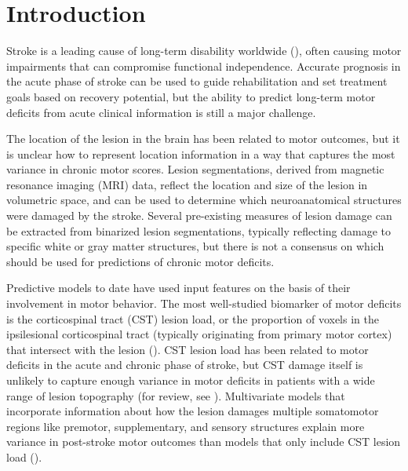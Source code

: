 \documentclass[10pt]{article}
\begin{document}
\section{Introduction}
Stroke is a leading cause of long-term disability worldwide (\cite{Katan2018-qn}), often causing motor impairments that can compromise functional independence. Accurate prognosis in the acute phase of stroke can be used to guide rehabilitation and set treatment goals based on recovery potential, but the ability to predict long-term motor deficits from acute clinical information is still a major challenge.

The location of the lesion in the brain has been related to motor outcomes, but it is unclear how to represent location information in a way that captures the most variance in chronic motor scores. Lesion segmentations, derived from magnetic resonance imaging (MRI) data, reflect the location and size of the lesion in volumetric space, and can be used to determine which neuroanatomical structures were damaged by the stroke. 
Several pre-existing measures of lesion damage can be extracted from binarized lesion segmentations, typically reflecting damage to specific white or gray matter structures, but there is not a consensus on which should be used for predictions of chronic motor deficits. 

Predictive models to date have used input features on the basis of their involvement in motor behavior. The most well-studied biomarker of motor deficits is the corticospinal tract (CST) lesion load, or the proportion of voxels in the ipsilesional corticospinal tract (typically originating from primary motor cortex) that intersect with the lesion (\cite{Zhu2010-qh, Feng2015-du, Findlater2019-je, Lam2018-xh, Pineiro2000-dv}). CST lesion load has been related to motor deficits in the acute and chronic phase of stroke, but CST damage itself is unlikely to capture enough variance in motor deficits in patients with a wide range of lesion topography (for review, see \cite{Kim2017-xe}). Multivariate models that incorporate information about how the lesion damages multiple somatomotor regions like premotor, supplementary, and sensory structures explain more variance in post-stroke motor outcomes than models that only include CST lesion load (\cite{Ito2022-em, Sperber2021-lw, Rondina2016-ds, Rondina2017-ij, Schulz2012-yy}). 
\end{document}
